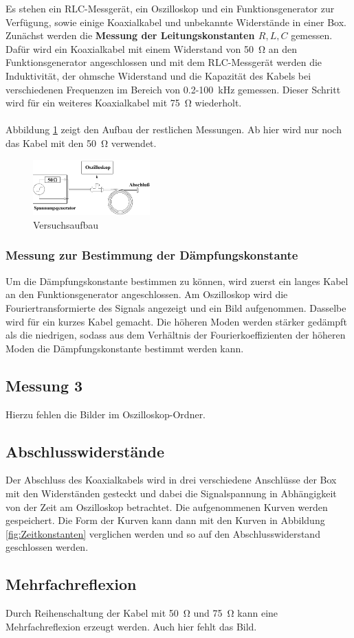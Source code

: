 Es stehen ein RLC-Messgerät, ein Oszilloskop und ein Funktionsgenerator zur Verfügung, sowie einige Koaxialkabel und unbekannte Widerstände in einer Box.
Zunächst werden die \textbf{Messung der Leitungskonstanten $R,L,C$} gemessen. Dafür wird ein Koaxialkabel mit einem Widerstand von \SI{50}{\ohm} an den Funktionsgenerator angeschlossen und mit dem RLC-Messgerät werden die Induktivität, der ohmsche Widerstand und die Kapazität des Kabels bei verschiedenen Frequenzen im Bereich von 0.2-\SI{100}{\kilo\hertz} gemessen. Dieser Schritt wird für ein weiteres Koaxialkabel mit \SI{75}{\ohm} wiederholt. \\
\ \\
Abbildung \ref{fig:Aufbau} zeigt den Aufbau der restlichen Messungen. Ab hier wird nur noch das Kabel mit den \SI{50}{\ohm} verwendet.
\begin{figure}[h]
	\centering
	\includegraphics[width=0.4\textwidth]{Aufbau.pdf}
	\caption{Versuchsaufbau \cite{E2}}
	\label{fig:Aufbau}
\end{figure}
\subsubsection*{Messung zur Bestimmung der Dämpfungskonstante}
Um die Dämpfungskonstante bestimmen zu können, wird zuerst ein langes Kabel an den Funktionsgenerator angeschlossen. Am Oszilloskop wird die Fouriertransformierte des Signals angezeigt und ein Bild aufgenommen. Dasselbe wird für ein kurzes Kabel gemacht. Die höheren Moden werden stärker gedämpft als die niedrigen, sodass aus dem Verhältnis der Fourierkoeffizienten der höheren Moden die Dämpfungskonstante bestimmt werden kann.
\subsection*{Messung 3}
Hierzu fehlen die Bilder im Oszilloskop-Ordner.
\subsection*{Abschlusswiderstände}
Der Abschluss des Koaxialkabels wird in drei verschiedene Anschlüsse der Box mit den Widerständen gesteckt und dabei die Signalspannung in Abhängigkeit von der Zeit am Oszilloskop betrachtet. Die aufgenommenen Kurven werden gespeichert. Die Form der Kurven kann dann mit den Kurven in Abbildung \ref{fig:Zeitkonstanten} verglichen werden und so auf den Abschlusswiderstand geschlossen werden.
\subsection*{Mehrfachreflexion}
Durch Reihenschaltung der Kabel mit \SI{50}{\ohm} und \SI{75}{\ohm} kann eine Mehrfachreflexion erzeugt werden. Auch hier fehlt das Bild.